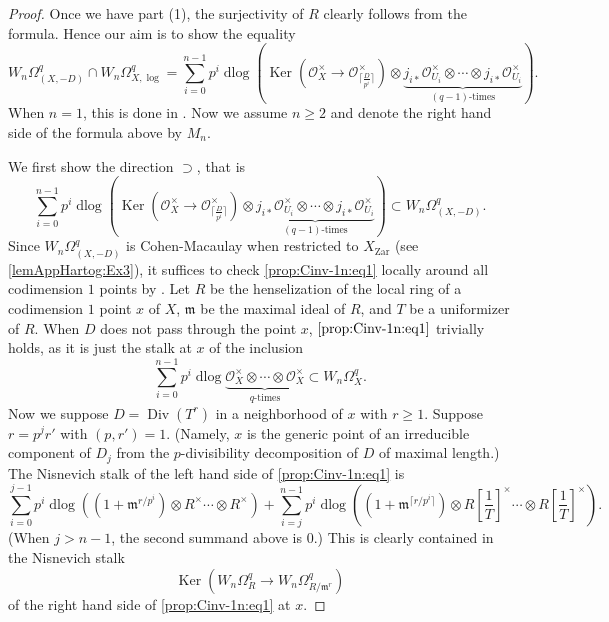 \documentclass[11pt]{amsart}
\newcommand{\eq}[2]{\begin{equation}\label{#1}#2 \end{equation}}
\newcommand{\ra}{\rightarrow}
\newcommand{\cO}{\mathcal{O}}
\newcommand{\ssm}{\mathfrak{m}}
\newcommand{\Ker}{\operatorname{Ker}}
\newcommand{\Div}{\operatorname{Div}}
\newcommand{\dlog}{\operatorname{dlog}}
\newcommand{\Zar}{{\operatorname{Zar}}}
\theoremstyle{plain}
\theoremstyle{definition}
\numberwithin{equation}{prop}
\begin{document}
\begin{proof}
Once we have part (1), the surjectivity of $R$ clearly follows from the formula.
Hence our aim is to show the equality
$$W_n\Omega^q_{(X,-D)}\cap W_n\Omega^q_{X,\log}
=
\sum_{i=0}^{n-1} 
 p^i \dlog\left(
 \Ker(\cO_X^\times\ra \cO_{ \lceil\frac{D}{p^i}\rceil}^ \times)\otimes
\underbrace{ j_{i*}\cO_{U_i}^\times \otimes \cdots \otimes j_{i*}\cO_{U_i}^\times}_{(q-1)\text{-times}} \right).$$
When $n=1$, this is done in .
Now we assume $n\ge 2$ and denote the right hand side of the formula above by 
$M_n.$



We first show the direction $\supset$, that is
\eq{prop:Cinv-1n:eq1}{
\sum_{i=0}^{n-1} 
 p^i \dlog\left(
 \Ker(\cO_X^\times\ra \cO_{ \lceil\frac{D}{p^i}\rceil}^ \times)\otimes
\underbrace{ j_{i*}\cO_{U_i}^\times \otimes \cdots \otimes j_{i*}\cO_{U_i}^\times}_{(q-1)\text{-times}} \right)
\subset W_n\Omega^q_{(X,-D)}.
}
Since $W_n\Omega^q_{(X,-D)}$ is Cohen-Macaulay when restricted to $X_\Zar$ (see \eqref{lemAppHartog:Ex3}), it suffices to check \eqref{prop:Cinv-1n:eq1} locally around all codimension $1$ points by .
Let $R$ be the henselization of the local ring of a codimension $1$ point $x$ of $X$,  $\ssm$ be the maximal ideal of $R$, and $T$ be a uniformizer of $R$.
When $D$ does not pass through the point $x$, $\eqref{prop:Cinv-1n:eq1}$ trivially holds, as it is just the stalk at $x$ of the inclusion
$$\sum_{i=0}^{n-1} 
 p^i \dlog
\underbrace{ \cO_{X}^\times \otimes \cdots \otimes \cO_{X}^\times}_{q\text{-times}}
\subset W_n\Omega^q_{X}.$$
Now we suppose $D=\Div(T^r)$ in a neighborhood of $x$ with $r\ge 1$.
Suppose $r=p^jr'$ with $(p,r')=1$.
(Namely, $x$ is the generic point of an irreducible component of $D_j$ from the $p$-divisibility decomposition of $D$ of maximal length.)
The Nisnevich stalk of the left hand side of \eqref{prop:Cinv-1n:eq1} is
\eq{prop:Cinv-1n:eq3}{
\sum_{i=0}^{j-1} 
p^i \dlog\left(
(1+\ssm^{r/p^i})
\otimes R^\times \cdots \otimes R^\times\right)
+
\sum_{i=j}^{n-1} 
p^i \dlog \left(
(1+\ssm^{\lceil r/p^i\rceil})
\otimes R[\frac{1}{T}]^\times \cdots \otimes R[\frac{1}{T}]^\times
\right)
.
}
(When $j>n-1$, the second summand above is $0$.)
This is clearly contained in the Nisnevich stalk 
$$\Ker\left(W_n\Omega^q_R\ra  W_n\Omega^q_{R/\ssm^r}\right)$$
of the right hand side of \eqref{prop:Cinv-1n:eq1} at $x$.




\end{proof}
\end{document}
